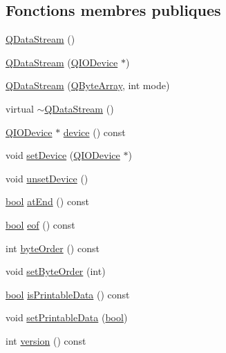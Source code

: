 \subsection*{Fonctions membres publiques}
\begin{DoxyCompactItemize}
\item 
\hyperlink{class_q_data_stream_ae8cfdb0d4d326f4bfbc38f8906e00f7b}{Q\+Data\+Stream} ()
\item 
\hyperlink{class_q_data_stream_a267a2b11f97234fe12449e82d03fe652}{Q\+Data\+Stream} (\hyperlink{class_q_i_o_device}{Q\+I\+O\+Device} $\ast$)
\item 
\hyperlink{class_q_data_stream_a0fe70be1e1b5371ea40859c25918f321}{Q\+Data\+Stream} (\hyperlink{qcstring_8h_ad6a390648110655c217fe072d45fbcf5}{Q\+Byte\+Array}, int mode)
\item 
virtual \hyperlink{class_q_data_stream_a69b54286e9842e39edad381c0e9e6cd6}{$\sim$\+Q\+Data\+Stream} ()
\item 
\hyperlink{class_q_i_o_device}{Q\+I\+O\+Device} $\ast$ \hyperlink{class_q_data_stream_a2d361d7eb01d7c62e01d37b00ada16f0}{device} () const 
\item 
void \hyperlink{class_q_data_stream_aa05d0c83cccfb3f193c365c6ee3bb323}{set\+Device} (\hyperlink{class_q_i_o_device}{Q\+I\+O\+Device} $\ast$)
\item 
void \hyperlink{class_q_data_stream_a00d9db572b7ce41ea1a8b321b024acbd}{unset\+Device} ()
\item 
\hyperlink{qglobal_8h_a1062901a7428fdd9c7f180f5e01ea056}{bool} \hyperlink{class_q_data_stream_aa651223db998942ab8ebdad08ea598f1}{at\+End} () const 
\item 
\hyperlink{qglobal_8h_a1062901a7428fdd9c7f180f5e01ea056}{bool} \hyperlink{class_q_data_stream_a85852207e006d972193308297473ded9}{eof} () const 
\item 
int \hyperlink{class_q_data_stream_a8c2c0afbfa6a670c3ea58e124c0bb680}{byte\+Order} () const 
\item 
void \hyperlink{class_q_data_stream_af15532c2efeaca9f8818fca55a7d7d02}{set\+Byte\+Order} (int)
\item 
\hyperlink{qglobal_8h_a1062901a7428fdd9c7f180f5e01ea056}{bool} \hyperlink{class_q_data_stream_ad223fd515286c4c3febd08393984a683}{is\+Printable\+Data} () const 
\item 
void \hyperlink{class_q_data_stream_acc3df7d01950ab1a4673019f4f471e8d}{set\+Printable\+Data} (\hyperlink{qglobal_8h_a1062901a7428fdd9c7f180f5e01ea056}{bool})
\item 
int \hyperlink{class_q_data_stream_ae140798d7698d48eb9b0be4f3e492735}{version} () const 

\end{DoxyCompactItemize}
